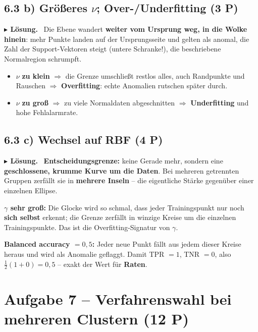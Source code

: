 \documentclass[10pt,a4paper]{article}
\newcommand{\pkt}[1]{\hfill\textbf{(#1 P)}}
\newenvironment{loes}%
  {\par\vspace{2pt}\begingroup\small\noindent\textbf{\color{loesfarbe}$\blacktriangleright$ Lösung.}\ }%
  {\endgroup\par\vspace{5pt}}
\begin{document}
\subsection*{6.3 b) Größeres $\nu$; Over-/Underfitting \pkt{3}}

\begin{loes}
Die Ebene wandert \textbf{weiter vom Ursprung weg, in die Wolke hinein}: mehr Punkte landen auf der
Ursprungsseite und gelten als anomal, die Zahl der Support-Vektoren steigt (untere Schranke!), die
beschriebene Normalregion schrumpft.
\begin{itemize}
\item $\nu$ \textbf{zu klein} $\Rightarrow$ die Grenze umschließt restlos alles, auch Randpunkte
  und Rauschen $\Rightarrow$ \textbf{Overfitting}: echte Anomalien rutschen später durch.
\item $\nu$ \textbf{zu groß} $\Rightarrow$ zu viele Normaldaten abgeschnitten $\Rightarrow$
  \textbf{Underfitting} und hohe Fehlalarmrate.
\end{itemize}
\end{loes}

\subsection*{6.3 c) Wechsel auf RBF \pkt{4}}

\begin{loes}
\textbf{Entscheidungsgrenze:} keine Gerade mehr, sondern eine \textbf{geschlossene, krumme Kurve um
die Daten}. Bei mehreren getrennten Gruppen zerfällt sie in \textbf{mehrere Inseln} -- die
eigentliche Stärke gegenüber einer einzelnen Ellipse.

\textbf{$\gamma$ sehr groß:} Die Glocke wird so schmal, dass jeder Trainingspunkt nur noch
\textbf{sich selbst} erkennt; die Grenze zerfällt in winzige Kreise um die einzelnen
Trainingspunkte. Das ist die Overfitting-Signatur von $\gamma$.

\textbf{Balanced accuracy $= 0{,}5$:} Jeder neue Punkt fällt aus jedem dieser Kreise heraus und wird
als Anomalie geflaggt. Damit TPR $=1$, TNR $=0$, also $\tfrac12(1+0) = 0{,}5$ -- exakt der Wert für
\textbf{Raten}.
\end{loes}

\newpage
\section*{Aufgabe 7 -- Verfahrenswahl bei mehreren Clustern \pkt{12}}
\end{document}
